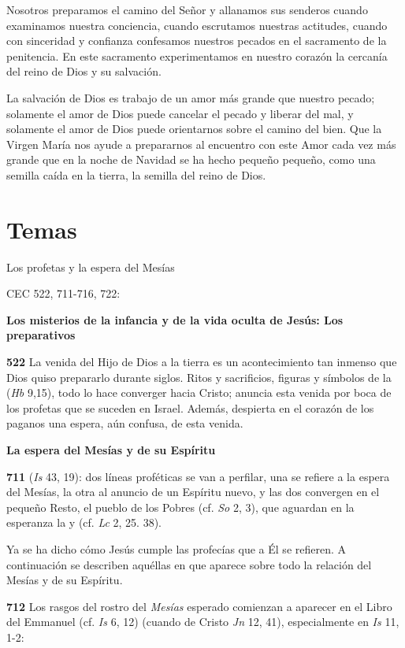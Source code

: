 \begin{body}
\begin{body}
Nosotros preparamos el camino del Señor y allanamos sus senderos cuando examinamos nuestra conciencia, cuando escrutamos nuestras actitudes, cuando con sinceridad y confianza confesamos nuestros pecados en el sacramento de la penitencia. En este sacramento experimentamos en nuestro corazón la cercanía del reino de Dios y su salvación.

La salvación de Dios es trabajo de un amor más grande que nuestro pecado; solamente el amor de Dios puede cancelar el pecado y liberar del mal, y solamente el amor de Dios puede orientarnos sobre el camino del bien. Que la Virgen María nos ayude a prepararnos al encuentro con este Amor cada vez más grande que en la noche de Navidad se ha hecho pequeño pequeño, como una semilla caída en la tierra, la semilla del reino de Dios.



\section{Temas}

Los profetas y la espera del Mesías

CEC 522, 711-716, 722:

\textbf{Los misterios de la infancia y de la vida oculta de Jesús: Los preparativos}

\textbf{522} La venida del Hijo de Dios a la tierra es un acontecimiento tan inmenso que Dios quiso prepararlo durante siglos. Ritos y sacrificios, figuras y símbolos de la  (\emph{Hb} 9,15), todo lo hace converger hacia Cristo; anuncia esta venida por boca de los profetas que se suceden en Israel. Además, despierta en el corazón de los paganos una espera, aún confusa, de esta venida.

\textbf{La espera del Mesías y de su Espíritu}

\textbf{711}  (\emph{Is} 43, 19): dos líneas proféticas se van a perfilar, una se refiere a la espera del Mesías, la otra al anuncio de un Espíritu nuevo, y las dos convergen en el pequeño Resto, el pueblo de los Pobres (cf. \emph{So} 2, 3), que aguardan en la esperanza la  y  (cf. \emph{Lc} 2, 25. 38).

Ya se ha dicho cómo Jesús cumple las profecías que a Él se refieren. A continuación se describen aquéllas en que aparece sobre todo la relación del Mesías y de su Espíritu.

\textbf{712} Los rasgos del rostro del \emph{Mesías} esperado comienzan a aparecer en el Libro del Emmanuel (cf. \emph{Is} 6, 12) (cuando  de Cristo \emph{Jn} 12, 41), especialmente en \emph{Is} 11, 1-2:


\end{body}
\end{body}
